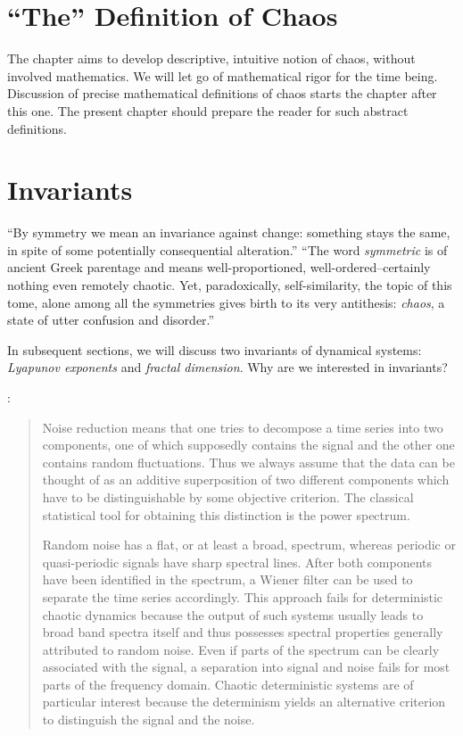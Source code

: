 \documentclass[12pt,twoside]{book}
\begin{document}
\section{``The'' Definition of Chaos}
The chapter aims to develop descriptive, intuitive notion of chaos, without involved mathematics.
We will let go of mathematical rigor for the time being.
Discussion of precise mathematical definitions of chaos starts the chapter after this one.
The present chapter should prepare the reader for such abstract definitions.

\section{Invariants}
``By symmetry we mean an invariance against change: something stays the same, in spite of some potentially consequential alteration.''
%
``The word \textit{symmetric} is of ancient Greek parentage and means well-proportioned, well-ordered--certainly nothing even remotely chaotic.
Yet, paradoxically, self-similarity, the topic of this tome, alone among all the symmetries gives birth to its very antithesis: \textit{chaos}, a state of utter confusion and disorder.''
\cite[p.xiii-xv]{schroeder}

In subsequent sections, we will discuss two invariants of dynamical systems: \textit{Lyapunov exponents} and \textit{fractal dimension}.
Why are we interested in invariants?

\citet[p.51]{kantz-schreiber}:
\begin{quotation}
Noise reduction means that one tries to decompose a time series into two components, one of which supposedly contains the signal and the other one contains random fluctuations.
Thus we always assume that the data can be thought of as an additive superposition of two different components which have to be distinguishable by some objective criterion.
The classical statistical tool for obtaining this distinction is the power spectrum.

Random noise has a flat, or at least a broad, spectrum, whereas periodic or quasi-periodic signals have sharp spectral lines.
After both components have been identified in the spectrum, a Wiener filter can be used to separate the time series accordingly.
This approach fails for deterministic chaotic dynamics because the output of such systems usually leads to broad band spectra itself and thus possesses spectral properties generally attributed to random noise.
Even if parts of the spectrum can be clearly associated with the signal, a separation into signal and noise fails for most parts of the frequency domain. Chaotic deterministic systems are of particular interest because the determinism yields an alternative criterion to distinguish the signal and the noise. 
\end{quotation}
\end{document}
